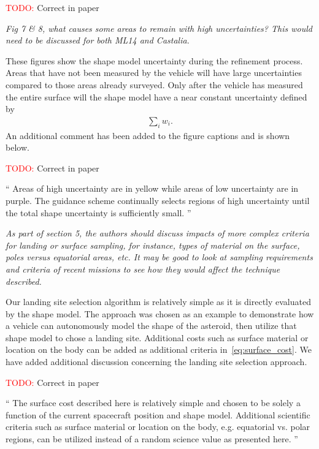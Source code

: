 \documentclass[11pt]{article}
\newcommand{\todo}{{\large \textcolor{red}{TODO: }}}
\newenvironment{correction}{\begin{list}{}{\setlength{\leftmargin}{1cm}\setlength{\rightmargin}{1cm}}\vspace{\parsep}\item[]``}{''\end{list}}
\newcommand{\comment}[1]{\item \itshape #1 \normalfont}
\begin{document}
\begin{itemize}
\todo Correct in paper

\comment{
Fig 7 \& 8, what causes some areas to remain with high uncertainties? This would need to be discussed for both ML14 and Castalia.
}

These figures show the shape model uncertainty during the refinement process.
Areas that have not been measured by the vehicle will have large uncertainties compared to those areas already surveyed. 
Only after the vehicle has measured the entire surface will the shape model have a near constant uncertainty defined by 
\begin{align*}
    \sum_i w_i.
\end{align*}
An additional comment has been added to the figure captions and is shown below.

\todo Correct in paper
\begin{correction}
    Areas of high uncertainty are in yellow while areas of low uncertainty are in purple.
    The guidance scheme continually selects regions of high uncertainty until the total shape uncertainty is sufficiently small.
\end{correction}

\comment{
As part of section 5, the authors should discuss impacts of more complex criteria for landing or surface sampling, for instance, types of material on the surface, poles versus equatorial areas, etc. 
It may be good to look at sampling requirements and criteria of recent missions to see how they would affect the technique described.
}

Our landing site selection algorithm is relatively simple as it is directly evaluated by the shape model.
The approach was chosen as an example to demonstrate how a vehicle can autonomously model the shape of the asteroid, then utilize that shape model to chose a landing site. 
Additional costs such as surface material or location on the body can be added as additional criteria in~\cref{eq:surface_cost}.
We have added additional discussion concerning the landing site selection approach.

\todo Correct in paper
\begin{correction}
    The surface cost described here is relatively simple and chosen to be solely a function of the current spacecraft position and shape model.
    Additional scientific criteria such as surface material or location on the body, e.g. equatorial vs. polar regions, can be utilized instead of a random science value as presented here.
\end{correction}


\end{itemize}
\end{document}
